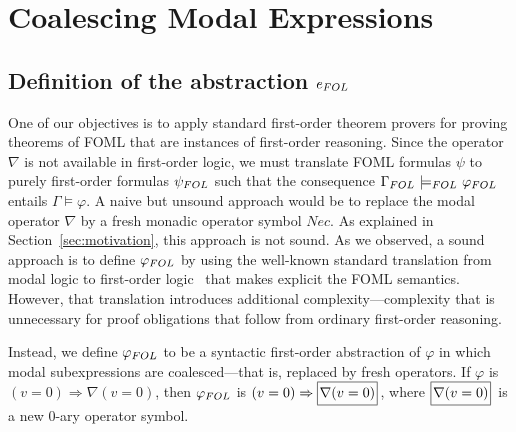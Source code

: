 \documentclass{easychair}
\renewcommand{\implies}{\Rightarrow}
\newcommand{\FOL}[1]{\ensuremath{#1_{\textit{\scriptsize FOL}}}}
\newcommand{\folmodels}{\mathop{\models_{\textit{\scriptsize FOL}}}}
\newcommand{\modal}{\nabla}
\newcommand{\II}{\mathcal{I}}
\newcommand{\B}[1]{\framebox{\rule{0pt}{.6em}\ensuremath{\!\tlachars #1\!}}\,}
\def\llnote{\ednote{LL}}
\let\tlachars\relax
\begin{document}
\section{Coalescing Modal Expressions}
\label{sec:coalescing-modal}

\subsection{Definition of the abstraction $\FOL{e}$}

One of our objectives is to apply standard first-order theorem provers
for proving theorems of FOML that are instances of first-order
reasoning.  Since the operator~$\modal$ is not available in first-order
logic, we must translate FOML formulas $\psi$ to purely
first-order formulas $\FOL{\psi}$ such that the consequence
$\FOL{\Gamma} \,\folmodels\, \FOL{\varphi}$ entails $\Gamma \models
\varphi$.  A naive but unsound approach would be to replace the modal
operator $\modal$ by a fresh monadic operator symbol $Nec$.
As explained in Section~\ref{sec:motivation}, this approach is not sound.
As we observed, a sound approach is to define $\FOL{\varphi}$ by using
the well-known standard translation from modal logic to first-order
logic~\cite{brauner:foml,ohlbach:translation} that makes explicit the
FOML semantics.  However, that translation introduces additional
complexity---complexity that is unnecessary for proof obligations that
follow from ordinary first-order reasoning.

Instead, we define $\FOL{\varphi}$ to be a syntactic first-order
abstraction of $\varphi$ in which modal subexpressions are
coalesced---that is, replaced by fresh operators.
If $\varphi$ is %
$(v=0) \implies \modal(v=0)$, then $\FOL{\varphi}$ is %
$(v = 0) \implies \B{\modal(v=0)}$,
where $\B{\modal(v=0)}$ is a new $0$-ary operator symbol.
%
\end{document}
